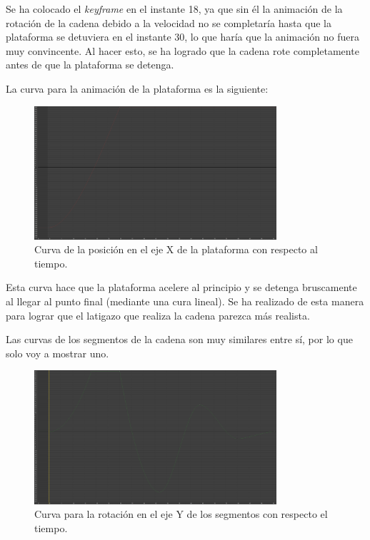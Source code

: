 \documentclass{article}
\begin{document}
Se ha colocado el \textit{keyframe} en el instante 18, ya que sin él la animación de la rotación de la cadena debido a la velocidad no se completaría hasta que la plataforma se detuviera en el instante 30, lo que haría que la animación no fuera muy convincente. Al hacer esto, se ha logrado que la cadena rote completamente antes de que la plataforma se detenga.

\newpage
La curva para la animación de la plataforma es la siguiente:

\begin{figure}[H]
    \centering
    \includegraphics[width=0.8\textwidth]{imagenes/Ejercicio4/curvas/base/red.png}
    \caption{Curva de la posición en el eje X de la plataforma con respecto al tiempo.}
\end{figure}

Esta curva hace que la plataforma acelere al principio y se detenga bruscamente al llegar al punto final (mediante una cura lineal). Se ha realizado de esta manera para lograr que el latigazo que realiza la cadena parezca más realista.

\bigskip

Las curvas de los segmentos de la cadena son muy similares entre sí, por lo que solo voy a mostrar uno.

\begin{figure}[H]
    \centering
    \includegraphics[width=0.8\textwidth]{imagenes/Ejercicio4/curvas/segmentos/green.png}
    \caption{Curva para la rotación en el eje Y de los segmentos con respecto el tiempo.}
\end{figure}
\end{document}
